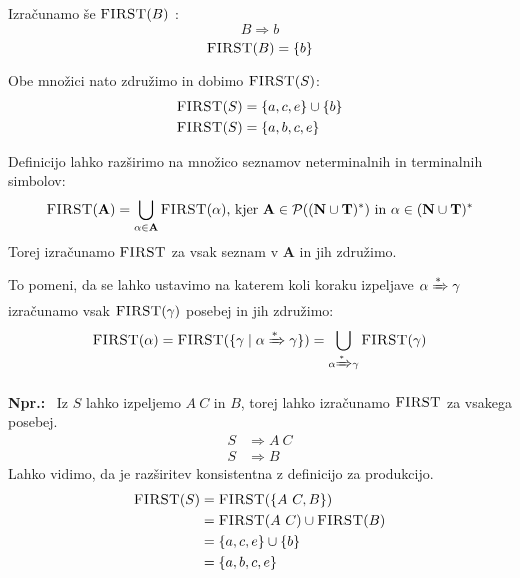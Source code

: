 \documentclass{article}
\newcommand{\Ex}{\textbf{Npr.:}\ }
\newcommand{\FIRST}{\textsc{FIRST}}
\newcommand{\Set}[1]{\mathbf{#1}}
\newcommand{\Terminals}{\Set{T}}
\newcommand{\NonTerminals}{\Set{N}}
\newcommand{\Powerset}[1]{\mathcal{P}(#1)}
\newcommand{\Derive}{\Rightarrow}
\newcommand{\DeriveStar}{\xRightarrow{\ast}}
\newcommand{\Seq}{\ }
\newcommand{\Kleene}[1]{#1^\ast}
\begin{document}
Izračunamo še $\FIRST(B)$ :
\begin{equation*}
  B \Derive b
\end{equation*}
\begin{equation*}
  \FIRST(B) = \{b\}
\end{equation*}

Obe množici nato združimo in dobimo $\FIRST(S)$:
\begin{align*}
  \FIRST(S) &= \{a, c, e\} \cup \{b\}\\
  \FIRST(S) &= \{a, b, c, e\}
\end{align*}

Definicijo lahko razširimo na množico seznamov neterminalnih in terminalnih simbolov:
\begin{equation*}
  \FIRST(\Set{A}) = \bigcup_{\alpha \in \Set{A}} \FIRST(\alpha) \text{, kjer } \Set{A} \in \Powerset{\Kleene{(\NonTerminals \cup \Terminals)}} \text{ in } \alpha \in \Kleene{(\NonTerminals \cup \Terminals)}
\end{equation*}
Torej izračunamo $\FIRST$ za vsak seznam v $\Set{A}$ in jih združimo.

To pomeni, da se lahko ustavimo na katerem koli koraku izpeljave $\alpha \DeriveStar \gamma$ izračunamo vsak $\FIRST(\gamma)$ posebej in jih združimo:
\begin{equation*}
  \FIRST(\alpha) = \FIRST(\{\gamma \mid \alpha \DeriveStar \gamma\}) = \bigcup_{\alpha \DeriveStar \gamma} \FIRST(\gamma)
\end{equation*}

\Ex
  Iz $S$ lahko izpeljemo $A \Seq C$ in $B$, torej lahko izračunamo $\FIRST$ za vsakega posebej.
  \begin{align*}
    S &\Derive A \Seq C\\
    S &\Derive B
  \end{align*}
  Lahko vidimo, da je razširitev konsistentna z definicijo za produkcijo.
  \begin{align*}
    \FIRST(S) &= \FIRST(\{A \Seq C, B\}) \\
              &= \FIRST(A \Seq C) \cup \FIRST(B)\\
              &= \{a, c, e\} \cup \{b\} \\
              &= \{a, b, c, e\}
  \end{align*}
\end{document}
